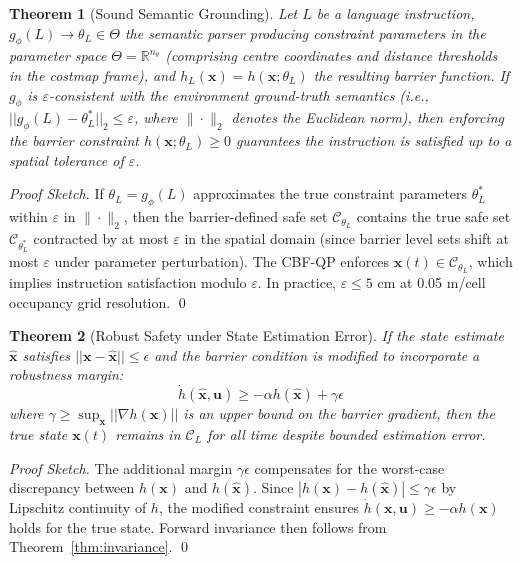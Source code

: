 \documentclass[conference]{IEEEtran}
\newtheorem{theorem}{Theorem}
\begin{document}
\begin{theorem}[Sound Semantic Grounding]
\label{thm:grounding}
Let $L$ be a language instruction, $g_\phi(L) \rightarrow \theta_L \in \Theta$ the semantic parser producing constraint parameters in the parameter space $\Theta = \mathbb{R}^{n_\theta}$ (comprising centre coordinates and distance thresholds in the costmap frame), and $h_L(\mathbf{x}) = h(\mathbf{x}; \theta_L)$ the resulting barrier function. If $g_\phi$ is $\varepsilon$-consistent with the environment ground-truth semantics (i.e., $||g_\phi(L) - \theta^*_L||_2 \le \varepsilon$, where $\|\cdot\|_2$ denotes the Euclidean norm), then enforcing the barrier constraint $h(\mathbf{x}; \theta_L) \ge 0$ guarantees the instruction is satisfied up to a spatial tolerance of $\varepsilon$.
\end{theorem}
\begin{proof}[Proof Sketch]
If $\theta_L = g_\phi(L)$ approximates the true constraint parameters $\theta^*_L$ within $\varepsilon$ in $\|\cdot\|_2$, then the barrier-defined safe set $\mathcal{C}_{\theta_L}$ contains the true safe set $\mathcal{C}_{\theta^*_L}$ contracted by at most $\varepsilon$ in the spatial domain (since barrier level sets shift at most $\varepsilon$ under parameter perturbation). The CBF-QP enforces $\mathbf{x}(t) \in \mathcal{C}_{\theta_L}$, which implies instruction satisfaction modulo $\varepsilon$. In practice, $\varepsilon \le 5$ cm at 0.05 m/cell occupancy grid resolution. \qed
\end{proof}

\begin{theorem}[Robust Safety under State Estimation Error]
\label{thm:robust}
If the state estimate $\hat{\mathbf{x}}$ satisfies $||\mathbf{x} - \hat{\mathbf{x}}|| \le \epsilon$ and the barrier condition is modified to incorporate a robustness margin:
\begin{equation}
\dot{h}(\hat{\mathbf{x}}, \mathbf{u}) \ge -\alpha h(\hat{\mathbf{x}}) + \gamma \epsilon
\end{equation}
where $\gamma \ge \sup_{\mathbf{x}} || \nabla h(\mathbf{x}) ||$ is an upper bound on the barrier gradient, then the true state $\mathbf{x}(t)$ remains in $\mathcal{C}_L$ for all time despite bounded estimation error.
\end{theorem}
\begin{proof}[Proof Sketch]
The additional margin $\gamma \epsilon$ compensates for the worst-case discrepancy between $h(\mathbf{x})$ and $h(\hat{\mathbf{x}})$. Since $|h(\mathbf{x}) - h(\hat{\mathbf{x}})| \le \gamma \epsilon$ by Lipschitz continuity of $h$, the modified constraint ensures $\dot{h}(\mathbf{x}, \mathbf{u}) \ge -\alpha h(\mathbf{x})$ holds for the true state. Forward invariance then follows from Theorem~\ref{thm:invariance}. \qed
\end{proof}
\end{document}
